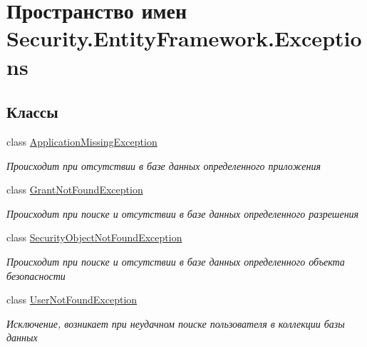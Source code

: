 \hypertarget{namespace_security_1_1_entity_framework_1_1_exceptions}{}\section{Пространство имен Security.\+Entity\+Framework.\+Exceptions}
\label{namespace_security_1_1_entity_framework_1_1_exceptions}
\subsection*{Классы}
\begin{DoxyCompactItemize}
\item 
class \hyperlink{class_security_1_1_entity_framework_1_1_exceptions_1_1_application_missing_exception}{Application\+Missing\+Exception}
\begin{DoxyCompactList}\small\item\em Происходит при отсутствии в базе данных определенного приложения \end{DoxyCompactList}\item 
class \hyperlink{class_security_1_1_entity_framework_1_1_exceptions_1_1_grant_not_found_exception}{Grant\+Not\+Found\+Exception}
\begin{DoxyCompactList}\small\item\em Происходит при поиске и отсутствии в базе данных определенного разрешения \end{DoxyCompactList}\item 
class \hyperlink{class_security_1_1_entity_framework_1_1_exceptions_1_1_security_object_not_found_exception}{Security\+Object\+Not\+Found\+Exception}
\begin{DoxyCompactList}\small\item\em Происходит при поиске и отсутствии в базе данных определенного объекта безопасности \end{DoxyCompactList}\item 
class \hyperlink{class_security_1_1_entity_framework_1_1_exceptions_1_1_user_not_found_exception}{User\+Not\+Found\+Exception}
\begin{DoxyCompactList}\small\item\em Исключение, возникает при неудачном поиске пользователя в коллекции базы данных \end{DoxyCompactList}\end{DoxyCompactItemize}
